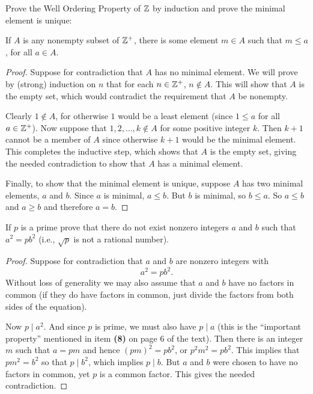  Prove the Well Ordering Property of $\mathbb{Z}$ by induction and
prove the minimal element is unique:
\begin{thm}
  If $A$ is any nonempty subset of $\mathbb{Z}^+$, there is some element
  $m\in A$ such that $m\leq a$, for all $a\in A$.
\end{thm}
\begin{proof}
  Suppose for contradiction that $A$ has no minimal element. We will
  prove by (strong) induction on $n$ that for each $n\in\mathbb{Z}^+$,
  $n\not\in A$. This will show that $A$ is the empty set, which would
  contradict the requirement that $A$ be nonempty.

  Clearly $1\not\in A$, for otherwise $1$ would be a least element
  (since $1\leq a$ for all $a\in\mathbb{Z}^+$). Now suppose that
  $1, 2, \ldots, k\not\in A$ for some positive integer $k$. Then
  $k + 1$ cannot be a member of $A$ since otherwise $k + 1$ would be
  the minimal element. This completes the inductive step, which shows
  that $A$ is the empty set, giving the needed contradiction to show
  that $A$ has a minimal element.

  Finally, to show that the minimal element is unique, suppose $A$ has
  two minimal elements, $a$ and $b$. Since $a$ is minimal, $a\leq
  b$. But $b$ is minimal, so $b\leq a$. So $a\leq b$ and $a\geq b$ and
  therefore $a = b$.
\end{proof}

 If $p$ is a prime prove that there do not exist nonzero
integers $a$ and $b$ such that $a^2 = pb^2$ (i.e., $\sqrt p$ is not a
rational number).
\begin{proof}
  Suppose for contradiction that $a$ and $b$ are nonzero integers with
  \begin{equation*}
    a^2 = pb^2.
  \end{equation*}
  Without loss of generality we may also assume that $a$ and $b$ have
  no factors in common (if they do have factors in common, just divide
  the factors from both sides of the equation).

  Now $p \mid a^2$. And since $p$ is prime, we must also have $p\mid
  a$ (this is the ``important property'' mentioned in item {\bf(8)} on
  page 6 of the text). Then there is an integer $m$ such that $a = pm$
  and hence $(pm)^2 = pb^2$, or $p^2m^2 = pb^2$. This implies that
  $pm^2 = b^2$ so that $p \mid b^2$, which implies $p\mid b$. But $a$
  and $b$ were chosen to have no factors in common, yet $p$ is a
  common factor. This gives the needed contradiction.
\end{proof}

